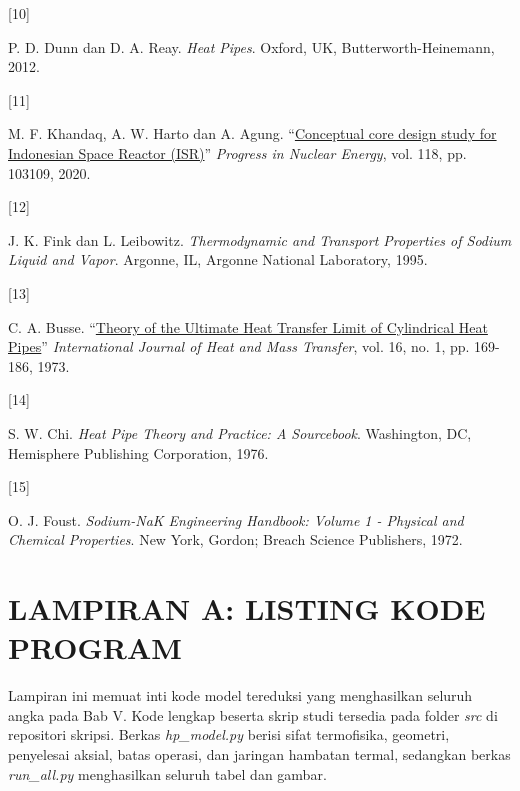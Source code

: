 \documentclass[
  indonesian,
  12pt,
  a4paper,
]{report}
\newlength{\cslhangindent}
\newlength{\csllabelwidth}
\newenvironment{CSLReferences}[2] %
 {\begin{list}{}{%
  \setlength{\itemindent}{0pt}
  \setlength{\leftmargin}{0pt}
  \setlength{\parsep}{0pt}
  \ifodd #1
   \setlength{\leftmargin}{\cslhangindent}
   \setlength{\itemindent}{-1\cslhangindent}
  \fi
  \setlength{\itemsep}{#2\baselineskip}}}
 {\end{list}}
\newcommand{\CSLLeftMargin}[1]{\parbox[t]{\csllabelwidth}{\strut#1\strut}}
\newcommand{\CSLRightInline}[1]{\parbox[t]{\linewidth - \csllabelwidth}{\strut#1\strut}}
\begin{document}
\begin{CSLReferences}{0}{1}
\CSLLeftMargin{{[}10{]} }%
\CSLRightInline{P. D. Dunn dan D. A. Reay. \emph{Heat Pipes}. Oxford,
UK, Butterworth-Heinemann, 2012.}

\CSLLeftMargin{{[}11{]} }%
\CSLRightInline{M. F. Khandaq, A. W. Harto dan A. Agung.
{``\href{https://doi.org/10.1016/j.pnucene.2019.103109}{Conceptual core
design study for Indonesian Space Reactor (ISR)}''} \emph{Progress in
Nuclear Energy}, vol. 118, pp. 103109, 2020.}

\CSLLeftMargin{{[}12{]} }%
\CSLRightInline{J. K. Fink dan L. Leibowitz. \emph{Thermodynamic and
Transport Properties of Sodium Liquid and Vapor}. Argonne, IL, Argonne
National Laboratory, 1995.}

\CSLLeftMargin{{[}13{]} }%
\CSLRightInline{C. A. Busse.
{``\href{https://doi.org/10.1016/0017-9310(73)90044-6}{Theory of the
Ultimate Heat Transfer Limit of Cylindrical Heat Pipes}''}
\emph{International Journal of Heat and Mass Transfer}, vol. 16, no. 1,
pp. 169-186, 1973.}

\CSLLeftMargin{{[}14{]} }%
\CSLRightInline{S. W. Chi. \emph{Heat Pipe Theory and Practice: A
Sourcebook}. Washington, DC, Hemisphere Publishing Corporation, 1976.}

\CSLLeftMargin{{[}15{]} }%
\CSLRightInline{O. J. Foust. \emph{Sodium-NaK Engineering Handbook:
Volume 1 - Physical and Chemical Properties}. New York, Gordon; Breach
Science Publishers, 1972.}

\end{CSLReferences}

\chapter*{LAMPIRAN A: LISTING KODE
PROGRAM}\label{lampiran-a-listing-kode-program}

Lampiran ini memuat inti kode model tereduksi yang menghasilkan seluruh
angka pada Bab V. Kode lengkap beserta skrip studi tersedia pada folder
\emph{src} di repositori skripsi. Berkas \emph{hp\_model.py} berisi
sifat termofisika, geometri, penyelesai aksial, batas operasi, dan
jaringan hambatan termal, sedangkan berkas \emph{run\_all.py}
menghasilkan seluruh tabel dan gambar.
\end{document}
